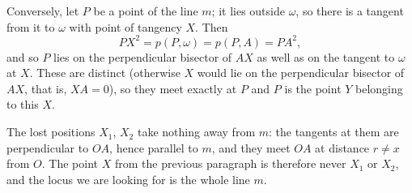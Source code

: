 {    Conversely, let $P$ be a point of the line $m$; it lies outside $\omega$, so there is a tangent from it to $\omega$ with point of tangency $X$. Then
    $$
    PX^2 = p(P,\omega) = p(P,A) = PA^2,
    $$
    and so $P$ lies on the perpendicular bisector of $AX$ as well as on the tangent to $\omega$ at $X$. These are distinct (otherwise $X$ would lie on the perpendicular bisector of $AX$, that is, $XA=0$), so they meet exactly at $P$ and $P$ is the point $Y$ belonging to this $X$.

    The lost positions $X_1$, $X_2$ take nothing away from $m$: the tangents at them are perpendicular to $OA$, hence parallel to $m$, and they meet $OA$ at distance $r \neq x$ from $O$. The point $X$ from the previous paragraph is therefore never $X_1$ or $X_2$, and the locus we are looking for is the whole line $m$.
}

